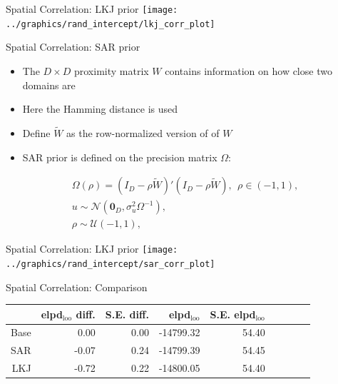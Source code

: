 \begin{frame}{Spatial Correlation: LKJ prior}
    \vspace{-1cm}
    \centering
    \texttt{[image: ../graphics/rand\_intercept/lkj\_corr\_plot]}
\end{frame}

\begin{frame}{Spatial Correlation: SAR prior}
    \begin{itemize}
        \item The $D\times D$ proximity matrix $W$ contains information on how close two domains are
        \item Here the Hamming distance is used
        \item Define $\widetilde W$ as the row-normalized version of of $W$
        \item SAR prior is defined on the precision matrix $\Omega$:
    \end{itemize}
    \begin{gather*}
        \Omega(\rho) = (I_D - \rho \widetilde W)'(I_D - \rho \widetilde W), ~~ \rho \in (-1, 1),\\
        u \sim \mathcal N(\boldsymbol{0}_D, \sigma_u^2 \Omega^{-1}),\\
        \rho \sim \mathcal U(-1, 1),
    \end{gather*}
\end{frame}

\begin{frame}{Spatial Correlation: LKJ prior}
    \vspace{-1cm}
    \centering
    \texttt{[image: ../graphics/rand\_intercept/sar\_corr\_plot]}
\end{frame}

\begin{frame}{Spatial Correlation: Comparison}
    \begin{table}[ht]
        \centering
        \begin{tabular}{rrrrrrrrr}
            \hline
            & elpd$_{\text{loo}}$ diff. & S.E. diff. & elpd$_{\text{loo}}$ & S.E. elpd$_{\text{loo}}$  \\
            \hline
            Base & 0.00 & 0.00 & -14799.32 & 54.40  \\
            SAR & -0.07 & 0.24 & -14799.39 & 54.45  \\
            LKJ & -0.72 & 0.22 & -14800.05 & 54.40  \\
            \hline
        \end{tabular}
        \label{tab:lkj_sar_base}
    \end{table}
\end{frame}

